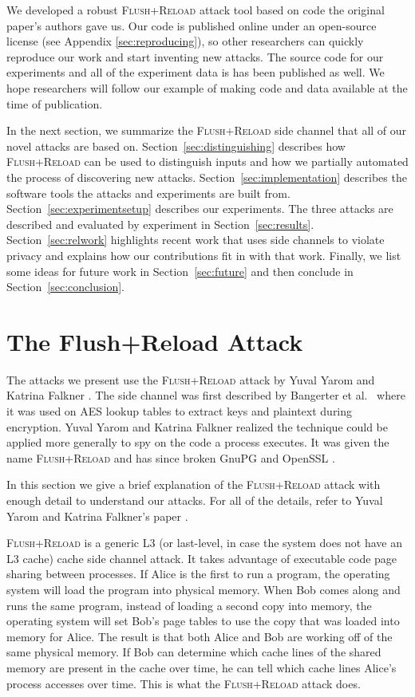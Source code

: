 \documentclass[letterpaper,twocolumn,10pt]{article}
\begin{document}
We developed a robust \textsc{Flush+Reload} attack tool based on code the
original paper's authors gave us. Our code is published online under an
open-source license (see Appendix \ref{sec:reproducing}), so other researchers
can quickly reproduce our work and start inventing new attacks. The source code
for our experiments and all of the experiment data is has been published as
well. We hope researchers will follow our example of making code and data
available at the time of publication.

In the next section, we summarize the \textsc{Flush+Reload} side channel that
all of our novel attacks are based on. Section~\ref{sec:distinguishing}
describes how \textsc{Flush+Reload} can be used to distinguish inputs and how we
partially automated the process of discovering new attacks.
Section~\ref{sec:implementation} describes the software tools the attacks and
experiments are built from. Section~\ref{sec:experimentsetup} describes our
experiments. The three attacks are described and evaluated by experiment in
Section~\ref{sec:results}. Section~\ref{sec:relwork} highlights recent work that
uses side channels to violate privacy and explains how our contributions fit in
with that work. Finally, we list some ideas for future work in
Section~\ref{sec:future} and then conclude in Section~\ref{sec:conclusion}.

\section{The Flush+Reload Attack}
\label{sec:flushreload}

The attacks we present use the \textsc{Flush+Reload} attack by Yuval Yarom and
Katrina Falkner \cite{yarom2013flush}. The side channel was first described by
Bangerter et al.\ \cite{gullasch2011cache} where it was used on AES lookup
tables to extract keys and plaintext during encryption. Yuval Yarom and Katrina
Falkner realized the technique could be applied more generally to spy on the
code a process executes. It was given the name \textsc{Flush+Reload} and has
since broken GnuPG \cite{yarom2013flush} and OpenSSL \cite{benger2014ooh,
yarom2014recovering}.

In this section we give a brief explanation of the \textsc{Flush+Reload} attack
with enough detail to understand our attacks. For all of the details, refer to
Yuval Yarom and Katrina Falkner's paper \cite{yarom2013flush}.

\textsc{Flush+Reload} is a generic L3 (or last-level, in case the system does
not have an L3 cache) cache side channel attack. It takes advantage of
executable code page sharing between processes. If Alice is the first to run
a program, the operating system will load the program into physical memory. When
Bob comes along and runs the same program, instead of loading a second copy into
memory, the operating system will set Bob's page tables to use the copy that was
loaded into memory for Alice. The result is that both Alice and Bob are working
off of the same physical memory. If Bob can determine which cache lines of the
shared memory are present in the cache over time, he can tell which cache lines
Alice's process accesses over time. This is what the \textsc{Flush+Reload}
attack does.
\end{document}

